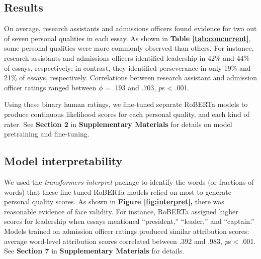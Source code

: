 \documentclass[11pt]{report}
\begin{document}
\begin{mainf}
\section{Results}

On average, research assistants and admissions officers found evidence for two out of seven personal qualities in each essay. As shown in \textbf{Table \ref{tab:concurrent}}, some personal qualities were more commonly observed than others. For instance, research assistants and admissions officers identified leadership in 42\% and 44\% of essays, respectively; in contrast, they identified perseverance in only 19\% and 21\% of essays, respectively. Correlations between research assistant and admission officer ratings ranged between $\phi$ = .193 and .703, \textit{p}s < .001.

Using these binary human ratings, we fine-tuned separate RoBERTa models to produce continuous likelihood scores for each personal quality, and each kind of rater. See \textbf{Section 2} in \textbf{Supplementary Materials} for details on model pretraining and fine-tuning.

\subsection{Model interpretability}
We used the \textit{transformers-interpret} package \cite{pierse_transformers_2021,janizek_explaining_2020} to identify the words (or fractions of words) that these fine-tuned RoBERTa models relied on most to generate personal quality scores. 
As shown in \textbf{Figure \ref{fig:interpret},} there was reasonable evidence of face validity. For instance, RoBERTa assigned higher scores for leadership when essays mentioned ``president,'' ``leader,'' and ``captain.'' Models trained on admission officer ratings produced similar attribution scores: average word-level attribution scores correlated between .392 and .983, \textit{p}s < .001.
See \textbf{Section 7} in \textbf{Supplementary Materials} for details.


\end{mainf}
\end{document}
